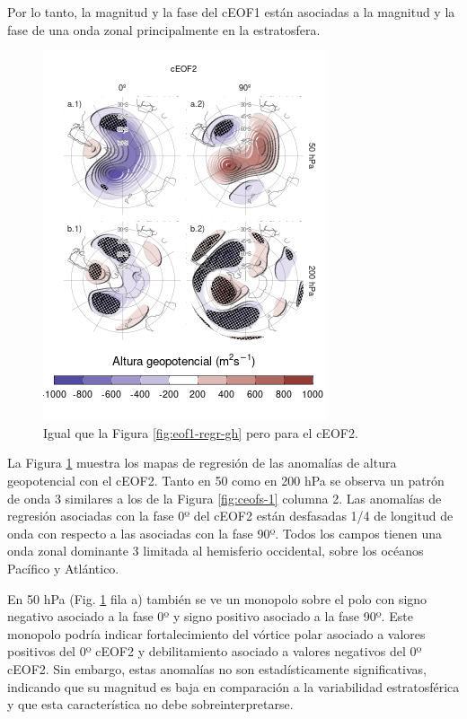 \documentclass[12pt,oneside]{reedthesis}
\begin{document}
Por lo tanto, la magnitud y la fase del cEOF1 están asociadas a la magnitud y la fase de una onda zonal principalmente en la estratosfera.



\begin{figure}
\includegraphics{figures/20-ceofs/eof2-regr-gh-1} \caption{Igual que la Figura \ref{fig:eof1-regr-gh} pero para el cEOF2.}\label{fig:eof2-regr-gh}
\end{figure}

La Figura \ref{fig:eof2-regr-gh} muestra los mapas de regresión de las anomalías de altura geopotencial con el cEOF2.
Tanto en 50 como en 200 hPa se observa un patrón de onda 3 similares a los de la Figura \ref{fig:ceofs-1} columna 2.
Las anomalías de regresión asociadas con la fase 0º del cEOF2 están desfasadas 1/4 de longitud de onda con respecto a las asociadas con la fase 90º.
Todos los campos tienen una onda zonal dominante 3 limitada al hemisferio occidental, sobre los océanos Pacífico y Atlántico.

En 50 hPa (Fig. \ref{fig:eof2-regr-gh} fila a) también se ve un monopolo sobre el polo con signo negativo asociado a la fase 0º y signo positivo asociado a la fase 90º.
Este monopolo podría indicar fortalecimiento del vórtice polar asociado a valores positivos del 0º cEOF2 y debilitamiento asociado a valores negativos del 0º cEOF2.
Sin embargo, estas anomalías no son estadísticamente significativas, indicando que su magnitud es baja en comparación a la variabilidad estratosférica y que esta característica no debe sobreinterpretarse.
\end{document}
